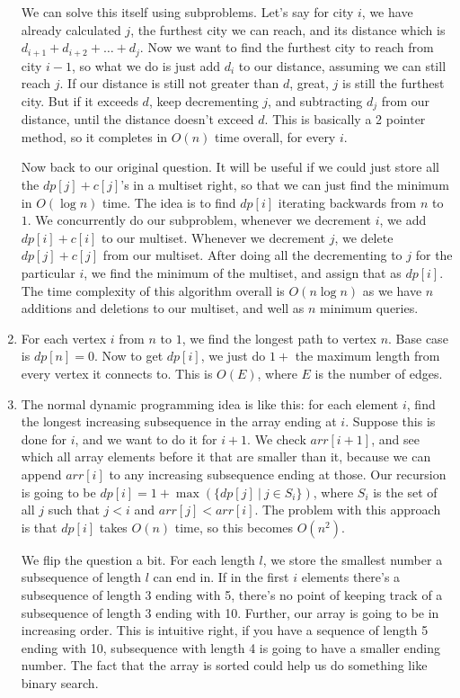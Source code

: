 \documentclass[12pt]{report}
\begin{document}
\begin{enumerate}[label=\textbf{\arabic*.}]
  We can solve this itself using subproblems. Let's say for city $i$, we have already calculated $j$, the furthest city we can reach, and its distance which is $d_{i+1} + d_{i+2} + \dots + d_j$.
  Now we want to find the furthest city to reach from city $i-1$, so what we do is just add $d_i$ to our distance, assuming we can still reach $j$. If our distance is still not greater than $d$, 
  great, $j$ is still the furthest city. But if it exceeds $d$, keep decrementing $j$, and subtracting $d_j$ from our distance, until the distance doesn't exceed $d$. This is basically a 2 pointer
  method, so it completes in $O(n)$ time overall, for every $i$.

  Now back to our original question. It will be useful if we could just store all the $dp[j] + c[j]$'s in a multiset right, so that we can just find the minimum in $O(\log n)$ time. The idea is 
  to find $dp[i]$ iterating backwards from $n$ to $1$. We concurrently do our subproblem, whenever we decrement $i$, we add $dp[i] + c[i]$ to our multiset. Whenever we decrement $j$, we delete 
  $dp[j] + c[j]$ from our multiset. After doing all the decrementing to $j$ for the particular $i$, we find the minimum of the multiset, and assign that as $dp[i]$. The time complexity of this 
  algorithm overall is $O(n \log n)$ as we have $n$ additions and deletions to our multiset, and well as $n$ minimum queries.
  
  \item For each vertex $i$ from $n$ to $1$, we find the longest path to vertex $n$. Base case is $dp[n] = 0$. Now to get $dp[i]$, we just do $1 + $ the maximum length from every vertex it connects 
  to. This is $O(E)$, where $E$ is the number of edges.

  \item The normal dynamic programming idea is like this: for each element $i$, find the longest increasing subsequence in the array ending at $i$. Suppose this is done for $i$, and we want to 
  do it for $i+1$. We check $arr[i+1]$, and see which all array elements before it that are smaller than it, because we can append $arr[i]$ to any increasing subsequence ending at those. Our recursion
  is going to be $dp[i] = 1 + \max(\{dp[j] \ | \ j \in S_i\})$, where $S_i$ is the set of all $j$ such that $j < i$ and $arr[j] < arr[i]$. The problem with this approach is that $dp[i]$ takes $O(n)$
  time, so this becomes $O(n^2)$.

  We flip the question a bit. For each length $l$, we store the smallest number a subsequence of length $l$ can end in. If in the first $i$ elements there's a subsequence of length 3 ending with 5, 
  there's no point of keeping track of a subsequence of length 3 ending with 10. Further, our array is going to be in increasing order. This is intuitive right, if you have a sequence of length 5
  ending with 10, subsequence with length 4 is going to have a smaller ending number. The fact that the array is sorted could help us do something like binary search.


\end{enumerate}
\end{document}
